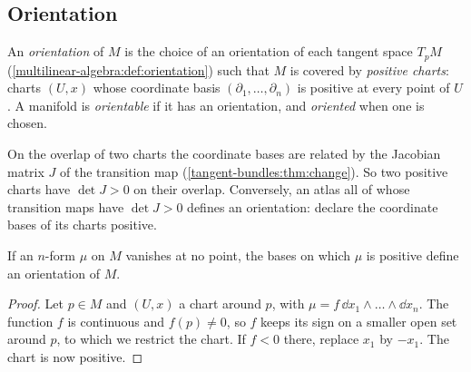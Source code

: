 \begin{notechapter}
\section{Orientation}\label{stokes:sec:orientation}

\begin{definition}\label{stokes:def:orientation}
An \emph{orientation} of $M$ is the choice of an orientation of each
tangent space $T_pM$ (\cref{multilinear-algebra:def:orientation}) such
that $M$ is covered by \emph{positive charts}: charts $(U, x)$ whose
coordinate basis $(\partial_1,\dots,\partial_n)$ is positive at every
point of $U$. A manifold is \emph{orientable} if it has an orientation,
and \emph{oriented} when one is chosen.
\end{definition}

On the overlap of two charts the coordinate bases are related by the
Jacobian matrix $J$ of the transition map
(\cref{tangent-bundles:thm:change}). So two positive charts have
$\det J > 0$ on their overlap. Conversely, an atlas all of whose
transition maps have $\det J > 0$ defines an orientation: declare the
coordinate bases of its charts positive.

\begin{proposition}\label{stokes:prop:form}
If an $n$-form $\mu$ on $M$ vanishes at no point, the bases on which
$\mu$ is positive define an orientation of $M$.
\end{proposition}

\begin{proof}
Let $p\in M$ and $(U, x)$ a chart around $p$, with
$\mu = f\,\dd x_1\wedge\dots\wedge\dd x_n$. The function $f$ is
continuous and $f(p)\neq0$, so $f$ keeps its sign on a smaller open set
around $p$, to which we restrict the chart. If $f < 0$ there, replace
$x_1$ by $-x_1$. The chart is now positive.
\end{proof}


\end{notechapter}
